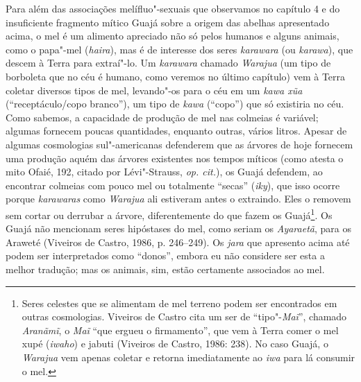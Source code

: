 Para além das associações melífluo"-sexuais que observamos no capítulo 4
e do insuficiente fragmento mítico Guajá sobre a origem das abelhas
apresentado acima, o mel é um alimento apreciado não só pelos humanos e
alguns animais, como o papa"-mel (\emph{haira}), mas é de interesse dos
seres \emph{karawara} (ou \emph{karawa}), que descem à Terra para
extraí"-lo. Um \emph{karawara} chamado \emph{Warajua} (um tipo de
borboleta que no céu é humano, como veremos no último capítulo) vem à
Terra coletar diversos tipos de mel, levando"-os para o céu em um
\emph{kawa xũa} (``receptáculo/copo branco''), um tipo de \emph{kawa}
(``copo'') que só existiria no céu. Como sabemos, a capacidade de produção
de mel nas colmeias é variável; algumas fornecem poucas quantidades,
enquanto outras, vários litros. Apesar de algumas cosmologias
sul"-americanas defenderem que as árvores de hoje fornecem uma produção
aquém das árvores existentes nos tempos míticos (como atesta o mito
Ofaié, 192, citado por Lévi"-Strauss, \emph{op. cit.}), os Guajá defendem, ao
encontrar colmeias com pouco mel ou totalmente ``secas'' (\emph{iky}),
que isso ocorre porque \emph{karawaras} como \emph{Warajua} ali
estiveram antes o extraindo. Eles o removem sem cortar ou derrubar a
árvore, diferentemente do que fazem os Guajá\footnote{Seres celestes que
  se alimentam de mel terreno podem ser encontrados em outras
  cosmologias. Viveiros de Castro cita um ser de ``tipo"-\emph{Maĩ}'',
  chamado \emph{Aranãmĩ}, o \emph{Maĩ} ``que ergueu o firmamento'', que
  vem à Terra comer o mel xupé (\emph{iwaho}) e jabuti (Viveiros de
  Castro, 1986: 238). No caso Guajá, o \emph{Warajua} vem apenas coletar
  e retorna imediatamente ao \emph{iwa} para lá consumir o mel.}. Os
Guajá não mencionam seres hipóstases do mel, como seriam os
\emph{Ayaraetã}, para os Araweté (Viveiros de Castro, 1986, p. 246--249).
Os \emph{jara} que apresento acima até podem ser interpretados como
``donos'', embora eu não considere ser esta a melhor tradução; mas os
animais, sim, estão certamente associados ao mel.

